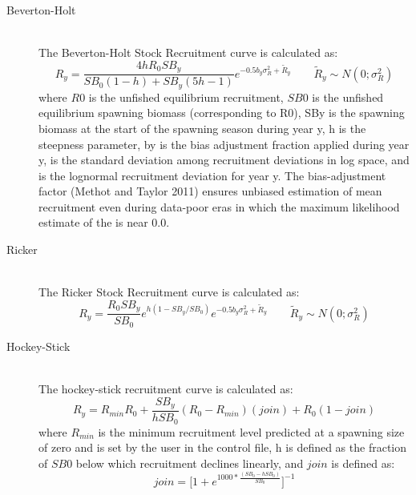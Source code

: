 \begin{description}
	\item[Beverton-Holt]\hfil\\
	The Beverton-Holt Stock Recruitment curve is calculated as:
	\begin{equation}{R_y = \frac{4hR_0SB_y}{SB_0(1-h)+SB_y(5h-1)}e^{-0.5b_y\sigma^2_R+\tilde{R}_y}\qquad  \tilde{R}_y\sim N(0;\sigma^2_R)}
	\end{equation}
	where $R0$ is the unfished equilibrium recruitment, $SB0$ is the unfished equilibrium spawning biomass (corresponding to R0), SBy is the spawning biomass at the start of the spawning season during year y, h is the steepness parameter, by is the bias adjustment fraction applied during year y,   is the standard deviation among recruitment deviations in log space, and   is the lognormal recruitment deviation for year y.  The bias-adjustment factor (Methot and Taylor 2011) ensures unbiased estimation of mean recruitment even during data-poor eras in which the maximum likelihood estimate of the   is near 0.0.

	\item[Ricker]\hfil\\
	The Ricker Stock Recruitment curve is calculated as:
	\begin{equation}{R_y = \frac{R_0SB_y}{SB_0}e^{h(1-SB_y/SB_0)}e^{-0.5b_y\sigma^2_R+\tilde{R}_y}\qquad  \tilde{R}_y\sim N(0;\sigma^2_R)}
	\end{equation}

	\item[Hockey-Stick]\hfil\\
	The hockey-stick recruitment curve is calculated as:
	\begin{equation}{R_y = R_{min}R_0+\frac{SB_y}{hSB_0}(R_0-R_{min})(join)+R_0(1-join) }\end{equation}
	where $R_{min}$ is the minimum recruitment level predicted at a spawning size of zero and is set by the user in the control file, h is defined as the fraction of $SB0$ below which recruitment declines linearly, and $join$ is defined as:
	\begin{equation}{ join = \bigg[1+e^{1000*\frac{(SB_0-hSB_0)}{SB_0}}\bigg]^{-1} } \end{equation}


\end{description}

